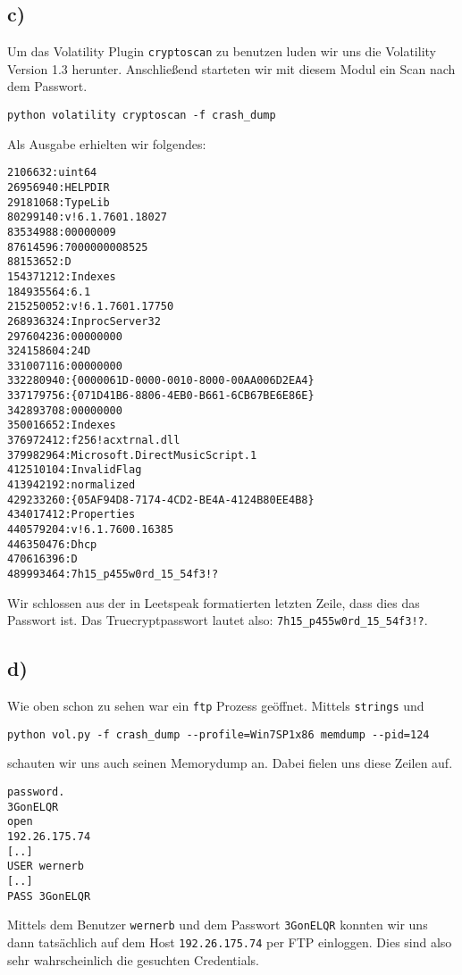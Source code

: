 \documentclass[10pt,a4paper]{article}
\begin{document}
\subsection*{c)}
Um das Volatility Plugin \texttt{cryptoscan} zu benutzen luden wir uns die Volatility Version 1.3 herunter. Anschließend starteten wir mit diesem Modul ein Scan nach dem Passwort.
\begin{verbatim}
python volatility cryptoscan -f crash_dump
\end{verbatim}
Als Ausgabe erhielten wir folgendes:
\begin{verbatim}
2106632:uint64
26956940:HELPDIR
29181068:TypeLib
80299140:v!6.1.7601.18027
83534988:00000009
87614596:7000000008525
88153652:D 
154371212:Indexes
184935564:6.1
215250052:v!6.1.7601.17750
268936324:InprocServer32
297604236:00000000
324158604:24D
331007116:00000000
332280940:{0000061D-0000-0010-8000-00AA006D2EA4}
337179756:{071D41B6-8806-4EB0-B661-6CB67BE6E86E}
342893708:00000000
350016652:Indexes
376972412:f256!acxtrnal.dll
379982964:Microsoft.DirectMusicScript.1
412510104:InvalidFlag
413942192:normalized
429233260:{05AF94D8-7174-4CD2-BE4A-4124B80EE4B8}
434017412:Properties
440579204:v!6.1.7600.16385
446350476:Dhcp
470616396:D 
489993464:7h15_p455w0rd_15_54f3!?
\end{verbatim}
Wir schlossen aus der in Leetspeak formatierten letzten Zeile, dass dies das Passwort ist.
Das Truecryptpasswort lautet also:
\texttt{7h15\_p455w0rd\_15\_54f3!?}.

\subsection*{d)}
Wie oben schon zu sehen war ein \texttt{ftp} Prozess geöffnet. Mittels \texttt{strings} und
\begin{verbatim}
python vol.py -f crash_dump --profile=Win7SP1x86 memdump --pid=124
\end{verbatim}
schauten wir uns auch seinen Memorydump an. Dabei fielen uns diese Zeilen auf.
\begin{verbatim}
password.
3GonELQR
open
192.26.175.74
[..]
USER wernerb
[..]
PASS 3GonELQR
\end{verbatim}
Mittels dem Benutzer \texttt{wernerb} und dem Passwort \texttt{3GonELQR} konnten wir uns dann tatsächlich auf dem Host \texttt{192.26.175.74} per FTP einloggen. Dies sind also sehr wahrscheinlich die gesuchten Credentials.
\end{document}
